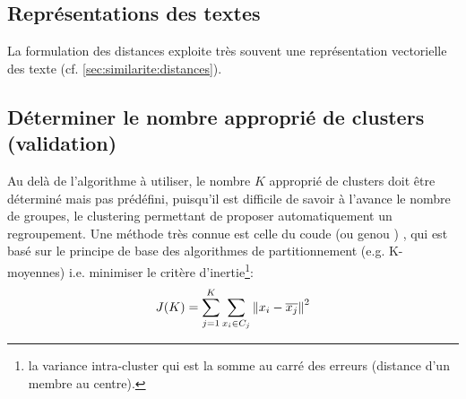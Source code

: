 
\subsection{Représentations des textes}
La formulation des distances exploite très souvent une représentation vectorielle des texte (cf.  \ref{sec:similarite:distances}). 


\subsection{Déterminer le nombre approprié de clusters (validation)}


 Au delà de l’algorithme à utiliser, le nombre $K$ approprié de clusters doit être déterminé mais pas prédéfini, puisqu'il est difficile de savoir à l'avance le nombre de groupes, le clustering permettant de proposer automatiquement un regroupement. Une méthode très connue est celle du \og coude \fg{}  (ou \og genou \fg{}) \citep{halkidi2001clustvalidation}, qui est basé sur le principe de base des algorithmes de partitionnement (e.g. K-moyennes) i.e. minimiser le critère d'inertie\footnote{la variance intra-cluster qui est la somme au carré des erreurs (distance d'un membre au centre).}:
\[J(K) = \sum\limits_{j=1}^K\sum\limits_{x_i \in C_j}\left\lVert x_i-\overline{x_j}\right\rVert^2\]

